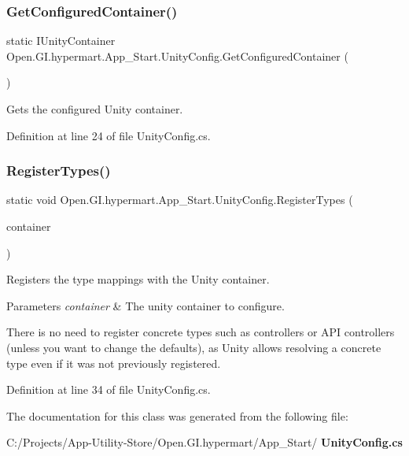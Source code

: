 \subsubsection{Get\+Configured\+Container()}
{\footnotesize\ttfamily static I\+Unity\+Container Open.\+G\+I.\+hypermart.\+App\+\_\+\+Start.\+Unity\+Config.\+Get\+Configured\+Container (\begin{DoxyParamCaption}{ }\end{DoxyParamCaption})\hspace{0.3cm}{\ttfamily [static]}}



Gets the configured Unity container. 



Definition at line 24 of file Unity\+Config.\+cs.

\mbox{\label{class_open_1_1_g_i_1_1hypermart_1_1_app___start_1_1_unity_config_abba412f0f6c67fdd94a735c3b09cc03e}} 
\subsubsection{Register\+Types()}
{\footnotesize\ttfamily static void Open.\+G\+I.\+hypermart.\+App\+\_\+\+Start.\+Unity\+Config.\+Register\+Types (\begin{DoxyParamCaption}\item[{I\+Unity\+Container}]{container }\end{DoxyParamCaption})\hspace{0.3cm}{\ttfamily [static]}}



Registers the type mappings with the Unity container.


\begin{DoxyParams}{Parameters}
{\em container} & The unity container to configure.\\
\hline
\end{DoxyParams}


There is no need to register concrete types such as controllers or A\+PI controllers (unless you want to change the defaults), as Unity allows resolving a concrete type even if it was not previously registered.

Definition at line 34 of file Unity\+Config.\+cs.



The documentation for this class was generated from the following file\+:\begin{DoxyCompactItemize}
\item 
C\+:/\+Projects/\+App-\/\+Utility-\/\+Store/\+Open.\+G\+I.\+hypermart/\+App\+\_\+\+Start/\textbf{ Unity\+Config.\+cs}\end{DoxyCompactItemize}
